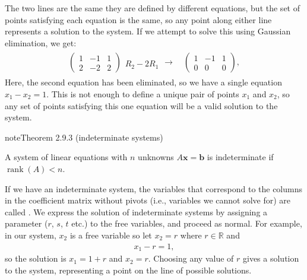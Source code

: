 \documentclass[letterpaper,10pt,english]{jupyterBook}
\begin{document}
\sphinxAtStartPar
The two lines are the same \sphinxhyphen{} they are defined by different equations, but the set of points satisfying each equation is the same, so any point along either line represents a solution to the system. If we attempt to solve this using Gaussian elimination, we get:
\begin{equation*}
\begin{split} \begin{align*}
    \left( \begin{array}{cc|c}
        1 & -1 & 1 \\
        2 & -2 & 2
    \end{array} \right)
    \begin{array}{l} \\ R_2 - 2R_1 \end{array} 
    \longrightarrow \quad
    \left( \begin{array}{cc|c}
        1 & -1 & 1 \\
        0 & 0 & 0 
    \end{array} \right),
\end{align*} \end{split}
\end{equation*}
\sphinxAtStartPar
Here, the second equation has been eliminated, so we have a single equation \(x_1 - x_2 = 1\). This is not enough to define a unique pair of points \(x_1\) and \(x_2\), so any set of points satisfying this one equation will be a valid solution to the system.
\label{_pages/2.6_Consistent_systems:indeterminate-system-theorem}
\begin{sphinxadmonition}{note}{Theorem 2.9.3 (indeterminate systems)}



\sphinxAtStartPar
A system of linear equations with \(n\) unknowns \(A\mathbf{x} = \mathbf{b}\) is indeterminate if \(\operatorname{rank}(A) < n\).
\end{sphinxadmonition}

\sphinxAtStartPar
If we have an indeterminate system, the variables that correspond to the columns in the coefficient matrix without pivots (i.e., variables we cannot solve for) are called . We express the solution of indeterminate systems by assigning a parameter (\(r\), \(s\), \(t\) etc.) to the free variables, and proceed as normal. For example, in our system, \(x_2\) is a free variable \sphinxhyphen{} so let \(x_2 = r\) where \(r \in \mathbb{R}\) and
\begin{equation*}
\begin{split} x_1 - r = 1, \end{split}
\end{equation*}
\sphinxAtStartPar
so the solution is \(x_1 = 1 + r\) and \(x_2 = r\). Choosing any value of \(r\) gives a solution to the system, representing a point on the line of possible solutions.
\end{document}
